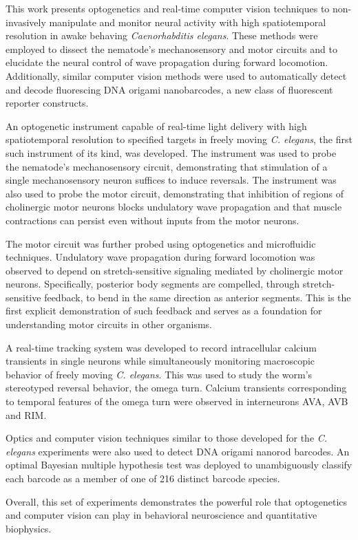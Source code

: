 





This work presents optogenetics and real-time computer vision techniques to non-invasively manipulate and monitor neural activity with high spatiotemporal resolution in awake behaving \textit{Caenorhabditis elegans}. These methods were employed to dissect the nematode's mechanosensory and motor circuits and to elucidate the neural control of wave propagation during forward locomotion.  Additionally, similar computer vision methods were used to automatically detect and decode fluorescing DNA origami nanobarcodes, a new class of fluorescent reporter constructs.

An optogenetic instrument capable of real-time light delivery with high spatiotemporal resolution to specified targets in freely moving \textit{C. elegans}, the first such instrument of its kind, was developed. The instrument was used to probe the nematode's mechanosensory circuit, demonstrating that stimulation of a single mechanosensory neuron suffices to induce reversals. The instrument was also used to probe the motor circuit, demonstrating that inhibition of regions of cholinergic motor neurons blocks undulatory wave propagation and that muscle contractions can persist even without inputs from the motor neurons.

The motor circuit was further probed using optogenetics and microfluidic techniques. Undulatory wave propagation during forward locomotion was observed to depend on stretch-sensitive signaling mediated by cholinergic motor neurons. Specifically, posterior body segments are compelled, through stretch-sensitive feedback, to bend in the same
direction as anterior segments. This is the first explicit demonstration of such feedback and serves as a foundation for understanding motor circuits in other organisms. 

A real-time tracking system was developed to record intracellular calcium transients in single neurons while simultaneously monitoring macroscopic behavior of freely moving \textit{C. elegans}. This was used to study the worm's stereotyped reversal behavior, the omega turn. Calcium transients corresponding to temporal features of the omega turn were observed in interneurons AVA, AVB and RIM.

Optics and computer vision techniques similar to those developed for the \textit{C. elegans} experiments were also used to detect DNA origami nanorod barcodes. An optimal Bayesian multiple hypothesis test was deployed to unambiguously classify each barcode as a member of one of 216 distinct barcode species.

Overall, this set of experiments demonstrates the powerful role that optogenetics and computer vision can play in behavioral neuroscience and quantitative biophysics.